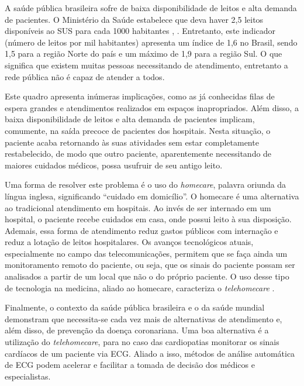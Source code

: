 A saúde pública brasileira sofre de baixa disponibilidade de leitos e alta demanda de pacientes. O Ministério da Saúde estabelece que deva haver 2,5 leitos disponíveis ao SUS para cada 1000 habitantes \cite{IBGE2009}, \cite{Brasil2002}. Entretanto, este indicador (número de leitos por mil habitantes) apresenta um índice de 1,6 no Brasil, sendo 1,5 para a região Norte do país e um máximo de 1,9 para a região Sul. O que significa que existem muitas pessoas necessitando de atendimento, entretanto a rede pública não é capaz de atender a todos.

Este quadro apresenta inúmeras implicações, como as já conhecidas filas de espera grandes e atendimentos realizados em espaços inapropriados. Além disso, a baixa disponibilidade de leitos e alta demanda de pacientes implicam, comumente, na saída precoce de pacientes dos hospitais. Nesta situação, o paciente acaba retornando às suas atividades sem estar completamente restabelecido, de modo que outro paciente, aparentemente necessitando de maiores cuidados médicos, possa usufruir de seu antigo leito.

Uma forma de resolver este problema é o uso do \emph{homecare}, palavra oriunda da língua inglesa, significando ``cuidado em domicílio''. O homecare é uma alternativa ao tradicional atendimento em hospitais. Ao invés de ser internado em um hospital, o paciente recebe cuidados em casa, onde possui leito à sua disposição. Ademais, essa forma de atendimento reduz gastos públicos com internação e reduz a lotação de leitos hospitalares. Os avanços tecnológicos atuais, especialmente no campo das telecomunicações, permitem que se faça ainda um monitoramento remoto do paciente, ou seja, que os sinais do paciente possam ser analisados a partir de um local que não o do próprio paciente. O uso desse tipo de tecnologia na medicina, aliado ao homecare, caracteriza o \emph{telehomecare} \cite{Augustyniak2009}.

Finalmente, o contexto da saúde pública brasileira e o da saúde mundial demonstram que necessita-se cada vez mais de alternativas de atendimento e, além disso, de prevenção da doença coronariana. Uma boa alternativa é a utilização do \emph{telehomecare}, para no caso das cardiopatias monitorar os sinais cardíacos de um paciente via ECG. Aliado a isso, métodos de análise automática de ECG podem acelerar e facilitar a tomada de decisão dos médicos e especialistas.


